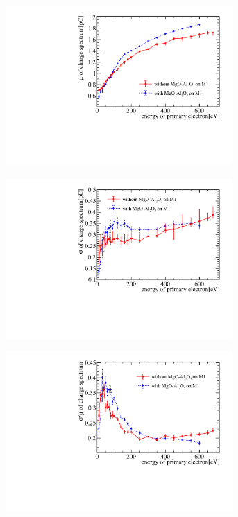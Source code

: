 \begin{figure}[!ht]
	\centering
	\begin{subfigure}[b]{0.5\textwidth}
		\centering
		\includegraphics[width=0.95\textwidth]{PMTRelated/GTmodel/gain_mu.pdf}
		\caption{}
		\label{fig:gain}
	\end{subfigure}%
	\begin{subfigure}[b]{0.5\textwidth}
		\centering
		\includegraphics[width=0.95\textwidth]{PMTRelated/GTmodel/gain_sigma.pdf}
		\caption{}
		\label{fig:sigma}
	\end{subfigure}
	\hfill
	\begin{subfigure}[b]{0.5\textwidth}
		\centering
		\includegraphics[width=0.95\textwidth]{PMTRelated/GTmodel/gain_sigmamu.pdf}

\end{subfigure}
\end{figure}
